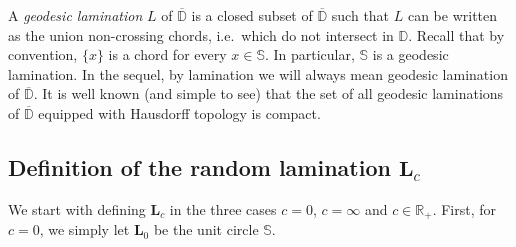 \documentclass[AHL,XML,longabstracts,Unicode]{cedram}
\newcommand{\R}{\mathbb{R}}
\newcommand{\D}{\mathbb{D}}
\def\S{\mathbb{S}}
\begin{document}
A \emph{geodesic lamination} $L$ of $\overline{\D}$ is a closed subset of $\overline{\D}$ such that $L$  can be written as the union non-crossing chords, i.e.\ which do not intersect in $\D$.
Recall that by convention, $ \{x\}$ is a chord for every $x \in \S$. In particular, $\S$ is a geodesic lamination. In the sequel, by lamination we will always mean geodesic lamination of $\overline{\D}$.  It is well known (and simple to see) that the set of all geodesic laminations of $\overline{\D}$ equipped with Hausdorff topology is compact.



\subsection{Definition of the random lamination \texorpdfstring{$\mathbf{L}_{c}$}{Lc}}
\label{sec:deflam}


We start with defining $\mathbf{L}_{c}$ in the three cases $c=0$, $c=\infty$ and $c \in \R_{+}$. First, for $c=0$, we simply let $\mathbf{L}_{0}$ be the unit circle $\mathbb{S}$.
\end{document}
